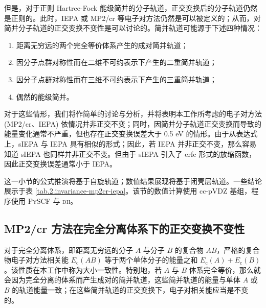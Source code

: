 但是，对于正则 Hartree-Fock 能级简并的分子轨道，正交变换后的分子轨道仍然是正则的。此时，IEPA 或 MP2/cr 等电子对方法仍然是可以被定义的；从而，对简并分子轨道的正交变换不变性是可以讨论的。简并轨道可能源于下述四种情况：
\begin{enumerate}[nosep]
  \item 距离无穷远的两个完全等价体系产生的成对简并轨道；
  \item 因分子点群对称性而在二维不可约表示下产生的二重简并轨道；
  \item 因分子点群对称性而在三维不可约表示下产生的三重简并轨道；
  \item 偶然的能级简并。
\end{enumerate}
对于这些情形，我们将作简单的讨论与分析，并将表明本工作所考虑的电子对方法 (MP2/cr、IEPA) 依情况并非正交不变；同时，因简并分子轨道正交变换而导致的能量变化通常不严重，但也存在正交变换误差大于 0.5 eV 的情形。由于从表达式上，sIEPA 与 IEPA 具有相似的形式；因此，若 IEPA 并非正交不变，那么容易知道 sIEPA 也同样并非正交不变。但由于 sIEPA 引入了 erfc 形式的放缩函数，因此正交变换误差通常小于 IEPA。

这一小节的公式推演将基于自旋轨道；数值结果展现将基于闭壳层轨道。一些结论展示于表 \ref{tab.2.invariance-mp2cr-iepa}。该节的数值计算使用 cc-pVDZ 基组，程序使用 \textsc{PySCF} 与 \textsc{dh}。

\begin{table}[!ht]
\centering
\caption{MP2/cr 与 IEPA 在不同情形下能级简并轨道间的正交变换不变性}
\label{tab.2.invariance-mp2cr-iepa}
\end{table}

\subsection{MP2/cr 方法在完全分离体系下的正交变换不变性}

对于完全分离体系，即距离无穷远的分子 $A$ 与分子 $B$ 的复合物 $AB$，严格的复合物电子对方法相关能 $E_\mathrm{c} (AB)$ 等于两个单体分子的能量之和 $E_\mathrm{c} (A) + E_\mathrm{c} (B)$。该性质在本工作中称为大小一致性。特别地，若 $A$ 与 $B$ 体系完全等价，那么就会因为完全分离的体系而产生成对的简并轨道，这些简并轨道的能量与单体 $A$ 或 $B$ 的轨道能量一致；在这些简并轨道的正交变换下，电子对相关能应当是不变的。

